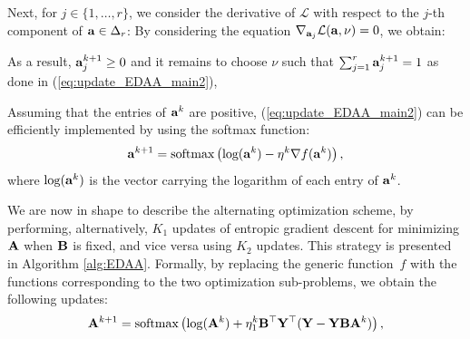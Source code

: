 Next, for $j \in \{1, \ldots, r\}$, we consider the derivative of $\mathcal{L}$ with respect to the $j$-th component of $\mathbf a \in \Delta_r$:
By considering the equation $\nabla_{\mathbf a_j} \mathcal{L}(\mathbf a, \nu) = 0$, we obtain:

 

As a result, $\mathbf a_j^{k+1} \geq 0$ and it remains to choose $\nu$ such that $\sum_{j=1}^r \mathbf a_j^{k+1} = 1$ as done in (\ref{eq:update_EDAA_main2}), 

Assuming that the entries of $\mathbf a^k$ are positive, (\ref{eq:update_EDAA_main2}) can be efficiently implemented by using the softmax function:
\begin{equation}
    \label{eq:update_EDAA_softmax2}
    \mathbf a^{k+1} = \text{softmax} \left( \text{log}(\mathbf a^k) - \eta^k \nabla f (\mathbf a^k)\right),
\end{equation}
where $\text{log}(\mathbf a^k)$ is the vector carrying the logarithm of each entry of $\mathbf a^k$.

We are now in shape to describe the alternating optimization scheme, by performing, alternatively, $K_1$ updates of entropic gradient descent for minimizing $\mathbf A$ when $\mathbf B$ is fixed, and vice versa using $K_2$ updates.
This strategy is presented in Algorithm \ref{alg:EDAA}.
Formally, by replacing the generic function~$f$ with the functions corresponding
to the two optimization sub-problems, we obtain the following updates:
\begin{equation} \label{eq:update_A}
\mathbf A^{k+1} = \text{softmax}\left( \log(\mathbf A^k) + \eta_1^k \mathbf B^\top \mathbf Y^\top (\mathbf Y - \mathbf Y \mathbf B \mathbf A^k) \right),
\end{equation}


